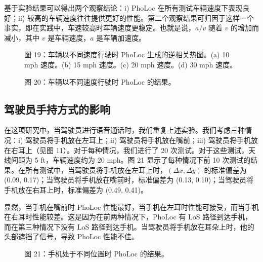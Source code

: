 \documentclass[journal, onecolumn]{IEEEtran}
\begin{document}
基于实验结果可以得出两个观察结论：i) PhoLoc 在所有测试车辆速度下表现良好；ii) 较高的车辆速度往往提供更好的性能。第二个观察结果可归因于这样一个事实，即在实践中，车速较高时车辆速度更稳定。也就是说，$a/v$ 随着 $v$ 的增加而减小，其中 $v$ 是车辆速度，$a$ 是车辆加速度。

\begin{figure}[htbp]
\centering
\caption{图 19：车辆以不同速度行驶时 PhoLoc 生成的逆相关热图。(a) 10 mph 速度。(b) 15 mph 速度。(c) 20 mph 速度。(d) 30 mph 速度。}
\label{fig:19}
\end{figure}

\begin{figure}[htbp]
\centering
\caption{图 20：车辆以不同速度行驶时 PhoLoc 的结果。}
\label{fig:20}
\end{figure}

\subsection{驾驶员手持方式的影响}
在这项研究中，当驾驶员进行语音通话时，我们重复上述实验。我们考虑三种情况：i) 驾驶员将手机放在左耳上；ii) 驾驶员将手机放在嘴前；iii) 驾驶员将手机放在右耳上（见图 11）。对于每种情况，我们进行了 20 次测试。对于这些测试，天线间距为 5 ft，车辆速度约为 20 mph。图 21 显示了每种情况下前 10 次测试的结果。在所有测试中，当驾驶员将手机放在左耳上时，$(\Delta x,\Delta y)$ 的标准偏差为 (0.09, 0.17)；当驾驶员将手机放在嘴前时，标准偏差为 (0.13, 0.10)；当驾驶员将手机放在右耳上时，标准偏差为 (0.49, 0.41)。

显然，当手机在嘴前时 PhoLoc 性能最好，当手机在左耳时性能可接受，而当手机在右耳时性能较差。这是因为在前两种情况下，PhoLoc 有 LoS 路径到达手机，而在第三种情况下没有 LoS 路径到达手机。当驾驶员将手机放在耳朵上时，他的头部遮挡了信号，导致 PhoLoc 性能不佳。

\begin{figure}[htbp]
\centering
\caption{图 21：手机处于不同位置时 PhoLoc 的结果。}
\label{fig:21}
\end{figure}
\end{document}

